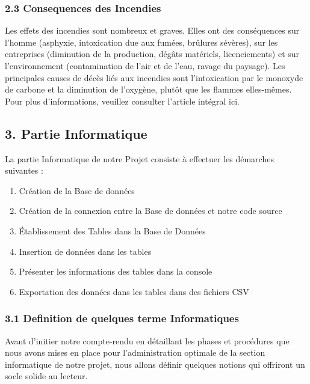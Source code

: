 \documentclass[
]{article}
\providecommand{\tightlist}{%
  \setlength{\itemsep}{0pt}\setlength{\parskip}{0pt}}
\begin{document}
\subsubsection{2.3 Consequences des
Incendies}\label{consequences-des-incendies}

Les effets des incendies sont nombreux et graves. Elles ont des
conséquences sur l'homme (asphyxie, intoxication due aux fumées,
brûlures sévères), sur les entreprises (diminution de la production,
dégâts matériels, licenciements) et sur l'environnement (contamination
de l'air et de l'eau, ravage du paysage). Les principales causes de
décès liés aux incendies sont l'intoxication par le monoxyde de carbone
et la diminution de l'oxygène, plutôt que les flammes elles-mêmes. Pour
plus d'informations, veuillez consulter l'article intégral ici.

\subsection{3. Partie Informatique}\label{partie-informatique}

La partie Informatique de notre Projet consiste à effectuer les
démarches suivantes :

\begin{enumerate}
\def\labelenumi{\arabic{enumi}.}
\tightlist
\item
  Création de la Base de données
\item
  Création de la connexion entre la Base de données et notre code source
\item
  Établissement des Tables dans la Base de Données
\item
  Insertion de données dans les tables
\item
  Présenter les informations des tables dans la console
\item
  Exportation des données dans les tables dans des fichiers CSV
\end{enumerate}

\subsubsection{3.1 Definition de quelques terme
Informatiques}\label{definition-de-quelques-terme-informatiques}

Avant d'initier notre compte-rendu en détaillant les phases et
procédures que nous avons mises en place pour l'administration optimale
de la section informatique de notre projet, nous allons définir quelques
notions qui offriront un socle solide au lecteur.
\end{document}
